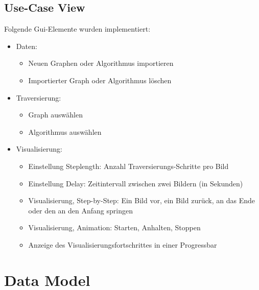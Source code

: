 \subsection{Use-Case View}
Folgende Gui-Elemente wurden implementiert:
\begin{itemize}
  \item Daten:
  \begin{itemize}
    \item Neuen Graphen oder Algorithmus importieren
    \item Importierter Graph oder Algorithmus l\"oschen
  \end{itemize}
  \item Traversierung:
  \begin{itemize}
    \item Graph ausw\"ahlen
    \item Algorithmus ausw\"ahlen
  \end{itemize}
  \item Visualisierung:
  \begin{itemize}
      \item Einstellung Steplength: Anzahl Traversierungs-Schritte pro Bild
      \item Einstellung Delay: Zeitintervall zwischen zwei Bildern (in Sekunden)      
      \item Visualisierung, Step-by-Step: Ein Bild vor, ein Bild zur\"uck, an das Ende oder den an den Anfang springen
      \item Visualisierung, Animation: Starten, Anhalten, Stoppen
      \item Anzeige des Visualisierungsfortschrittes in einer Progressbar
  \end{itemize}
\end{itemize}
% 
\section{Data Model}
\label{sec:Data Model}